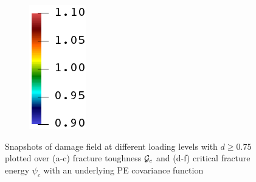 \begin{figure}[!htbp]
\begin{subfigure}[b]{0.08\textwidth}
    \includegraphics[width=\textwidth]{Chapter4/figures/rainbow_vertical.png}
    \vspace{0.15in}
  \end{subfigure}
  \caption{Snapshots of damage field at different loading levels with $d \geqslant 0.75$ plotted over (a-c) fracture toughness ${\mathcal{G}_c}$ and (d-f) critical fracture energy $\psi_c$ with an underlying PE covariance function }
  \label{fig: Chapter4/2D/compare_sensitivity_exp}
\end{figure}
